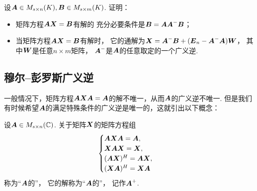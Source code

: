 \begin{example}
设\(\boldsymbol{A} \in M_{s \times n}(K), \boldsymbol{B} \in M_{s \times m}(K)\).
证明：\begin{itemize}
	\item 矩阵方程\(\boldsymbol{A} \boldsymbol{X} = \boldsymbol{B}\)有解的
	充分必要条件是\(\boldsymbol{B} = \boldsymbol{A} \boldsymbol{A}^- \boldsymbol{B}\)；
	\item 当矩阵方程\(\boldsymbol{A} \boldsymbol{X} = \boldsymbol{B}\)有解时，
	它的通解为\(\boldsymbol{X} = \boldsymbol{A}^- \boldsymbol{B} + (\boldsymbol{E}_n - \boldsymbol{A}^- \boldsymbol{A}) \boldsymbol{W}\)，
	其中\(\boldsymbol{W}\)是任意\(n \times m\)矩阵，
	\(\boldsymbol{A}^-\)是\(\boldsymbol{A}\)的任意取定的一个广义逆.
\end{itemize}
\end{example}

\subsection{穆尔--彭罗斯广义逆}
一般情况下，矩阵方程\(\boldsymbol{A} \boldsymbol{X} \boldsymbol{A} = \boldsymbol{A}\)的解不唯一，从而\(\boldsymbol{A}\)的广义逆不唯一.
但是我们有时候希望\(\boldsymbol{A}\)的满足特殊条件的广义逆是唯一的，这就引出以下概念：
\begin{definition}
设\(\boldsymbol{A} \in M_{s \times n}(\mathbb{C})\).
关于矩阵\(\boldsymbol{X}\)的矩阵方程组\begin{equation}\label{equation:线性方程组.彭罗斯方程组}
	\begin{cases}
		\boldsymbol{A} \boldsymbol{X} \boldsymbol{A} = \boldsymbol{A}, \\
		\boldsymbol{X} \boldsymbol{A} \boldsymbol{X} = \boldsymbol{X}, \\
		(\boldsymbol{A} \boldsymbol{X})^H = \boldsymbol{A} \boldsymbol{X}, \\
		(\boldsymbol{X} \boldsymbol{A})^H = \boldsymbol{X} \boldsymbol{A}
	\end{cases}
\end{equation}
称为“\(\boldsymbol{A}\)的”，
它的解称为“\(\boldsymbol{A}\)的”，
记作\(\boldsymbol{A}^+\).
\end{definition}

